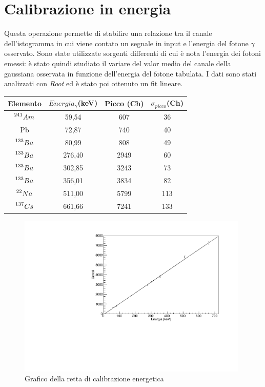 \documentclass[italian,11pt]{report}
\begin{document}
\vspace{3cm}
\section{Calibrazione in energia}
Questa operazione permette di stabilire una relazione tra il canale dell'istogramma in cui viene contato un segnale in input e l'energia del fotone $\gamma$ osservato. Sono  state utilizzate sorgenti differenti di cui è nota l'energia dei fotoni emessi: è stato quindi studiato il variare del valor medio del canale della gaussiana osservata in funzione dell'energia del fotone tabulata. I dati sono stati analizzati con \textit{Root} ed è stato poi ottenuto un fit lineare.

\vspace{2cm}
\begin{center}
    \centering
    \begin{tabular}{cccc}
    \hline
    Elemento& $Energia_{\gamma}$(keV)& Picco (Ch) &  $\sigma_{picco}$(Ch)\\
    \hline\hline
    $\prescript{241}{}{Am}_{}^{}$ & 59,54 & 607 & 36 \\
    Pb & 72,87 & 740 & 40 \\
    $\prescript{133}{}{Ba}_{}^{}$ & 80,99 & 808 & 49\\
    $\prescript{133}{}{Ba}_{}^{}$ & 276,40 & 2949 & 60 \\
    $\prescript{133}{}{Ba}_{}^{}$ & 302,85 & 3243 & 73 \\
    $\prescript{133}{}{Ba}_{}^{}$ & 356,01 & 3834 & 82 \\
    $\prescript{22}{}{Na}_{}^{}$ & 511,00 & 5799 & 113 \\
    $\prescript{137}{}{Cs}_{}^{}$ & 661,66 & 7241 & 133 \\
    
    \hline
    \end{tabular}
    \end{center}
\begin{figure}[htp]
\centering
\includegraphics[width=11cm]{fit_retta_calibrazioneEnergetica.pdf}
\caption{Grafico della retta di calibrazione energetica}
\end{figure}
\end{document}
